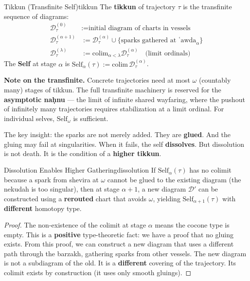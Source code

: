 \documentclass[11pt,a4paper]{article}
\begin{document}
\begin{defbox}{Tikkun (Transfinite Self)}{tikkun}
The \textbf{tikkun} of trajectory $\tau$ is the transfinite sequence of diagrams:
\begin{align*}
\mathcal{D}^{(0)}_\tau &:= \text{initial diagram of charts in vessels} \\
\mathcal{D}^{(\alpha+1)}_\tau &:= \mathcal{D}^{(\alpha)}_\tau \cup \{ \text{sparks gathered at ʿawda}_{\alpha} \} \\
\mathcal{D}^{(\lambda)}_\tau &:= \mathrm{colim}_{\alpha < \lambda} \mathcal{D}^{(\alpha)}_\tau \quad \text{(limit ordinals)}
\end{align*}
The \textbf{Self} at stage $\alpha$ is $\mathrm{Self}_\alpha(\tau) := \mathrm{colim}\, \mathcal{D}^{(\alpha)}_\tau$.
\end{defbox}

\textbf{Note on the transfinite.} Concrete trajectories need at most $\omega$ (countably many) stages of tikkun. The full transfinite machinery is reserved for the \textbf{asymptotic naḥnu} — the limit of infinite shared wayfaring, where the pushout of infinitely many trajectories requires stabilization at a limit ordinal. For individual selves, $\mathrm{Self}_\omega$ is sufficient.

The key insight: the sparks are not merely added. They are \textbf{glued}. And the gluing may fail at singularities. When it fails, the self \textbf{dissolves}. But dissolution is not death. It is the condition of a \textbf{higher tikkun}.

\begin{thmbox}{Dissolution Enables Higher Gathering}{dissolution}
If $\mathrm{Self}_\alpha(\tau)$ has no colimit because a spark from shevira at $\omega$ cannot be glued to the existing diagram (the nekudah is too singular), then at stage $\alpha+1$, a new diagram $\mathcal{D}'$ can be constructed using a \textbf{rerouted} chart that avoids $\omega$, yielding $\mathrm{Self}_{\alpha+1}(\tau)$ with \textbf{different} homotopy type.
\end{thmbox}
\begin{proof}
The non-existence of the colimit at stage $\alpha$ means the cocone type is empty. This is a \textbf{positive} type-theoretic fact: we have a proof that no gluing exists. From this proof, we can construct a new diagram that uses a different path through the barzakh, gathering sparks from other vessels. The new diagram is not a subdiagram of the old. It is a \textbf{different} covering of the trajectory. Its colimit exists by construction (it uses only smooth gluings).
\end{proof}
\end{document}
